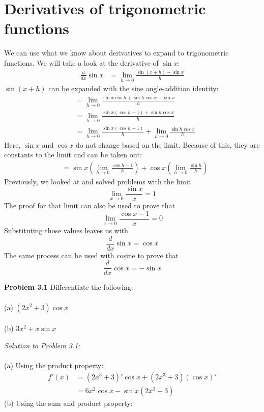 \documentclass[11pt]{scrartcl}
\begin{document}
\section{Derivatives of trigonometric functions}
\noindent
We can use what we know about derivatives to expand to trigonometric functions. We will take a look at the derivative of $\sin x$:
\begin{align*}
    \frac{d}{dx}\sin x & = \lim_{h \to 0} \frac{\sin (x+h)-\sin x}{h}
\end{align*}
$\sin (x+h)$ can be expanded with the sine angle-addition identity:
\begin{align*}
    & = \lim_{h \to 0} \frac{\sin x \cos h+\sin h \cos x-\sin x}{h}\\
    & = \lim_{h \to 0} \frac{\sin x(\cos h-1)+\sin h \cos x}{h}\\
    & = \lim_{h \to 0} \frac{\sin x(\cos h-1)}{h}+\lim_{h \to 0} \frac{\sin h \cos x}{h}
\end{align*}
Here, $\sin x$ and $\cos x$ do not change based on the limit. Because of this, they are constants to the limit and can be taken out:
\begin{align*}
    & = \sin x \left(\lim_{h \to 0} \frac{\cos h-1}{h}\right)+\cos x \left(\lim_{h \to 0} \frac{\sin h}{h}\right)
\end{align*}
Previously, we looked at and solved problems with the limit
$$\lim_{x \to 0} \frac{\sin x}{x}=1$$
The proof for that limit can also be used to prove that 
$$\lim_{x \to 0} \frac{\cos x-1}{x}=0$$
Substituting those values leaves us with
$$\frac{d}{dx}\sin x=\cos x$$
The same process can be used with cosine to prove that 
$$\frac{d}{dx}\cos x=-\sin x$$
\begin{tcolorbox}
[colback=purple!5!white,colframe=purple!75!black]
\textbf{Problem 3.1} Differentiate the following:\\
\noindent\\
(a) \;\;\;\;$(2x^2+3)\cos x$ \\
\noindent\\
(b) \;\;\;\;$3x^2+x \sin x$
\end{tcolorbox}
\noindent
\textit{Solution to Problem 3.1:}\\
\noindent\\
(a) Using the product property: 
\begin{align*}
    f'(x) & = (2x^3+3)'\cos x+(2x^3+3)(\cos x)'\\
          & = 6x^2\cos x-\sin x(2x^3+3)
\end{align*}
(b) Using the sum and product property:
\end{document}
